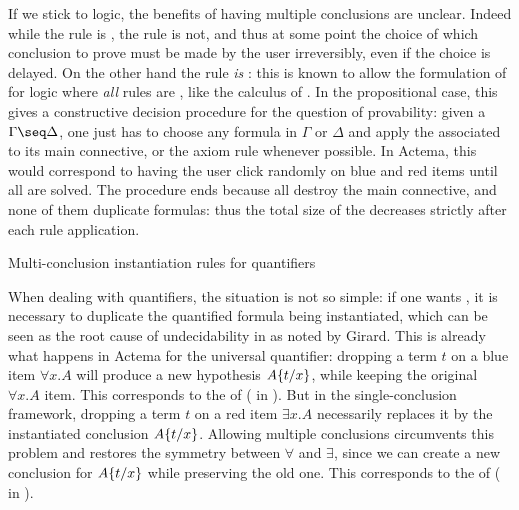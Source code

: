 If we stick to  logic, the benefits of having multiple conclusions
are unclear. Indeed while the {} rule is , the
{} rule is not, and thus at some point the choice of which
conclusion to prove must be made by the user irreversibly, even if the choice is
delayed. On the other hand the
{} rule \emph{is} : this is known to allow the
formulation of  for  logic where \emph{all} rules are
, like the  calculus of . In
the propositional case, this gives a constructive decision procedure for the
question of provability: given a  $\Gamma \seq \Delta$, one just has to
choose any formula in $\Gamma$ or $\Delta$ and apply the 
associated to its main connective, or the axiom rule whenever possible. In
Actema, this would correspond to having the user click randomly on blue and red
items until all  are solved. The procedure ends because all  destroy the main connective, and none of them duplicate formulas: thus the
total size of the  decreases strictly after each rule application.

\begin{marginfigure}
  \caption{Multi-conclusion instantiation rules for quantifiers}
\end{marginfigure}

When dealing with quantifiers, the situation is not so simple: if one wants
 , it is necessary to duplicate the quantified
formula being instantiated, which can be seen as the root cause of
undecidability in  as noted by
Girard\cite[Section~3.3.2]{girard:hal-01322183}. This is already what happens in
Actema for the universal quantifier: dropping a term $t$ on a blue item $\forall
x. A$ will produce a new hypothesis $A \{ t / x \}$, while keeping the
original $\forall x. A$ item. This corresponds to the 
 of  ({} in ).
But in the single-conclusion framework, dropping a term $t$ on a red item
$\exists x. A$ necessarily replaces it by the instantiated conclusion
$A \{ t / x \}$. Allowing multiple conclusions circumvents this problem and
restores the symmetry between $\forall$ and $\exists$, since we can create a new
conclusion for $A \{ t / x \}$ while preserving the old one. This corresponds
to the   of  ({} in
).

